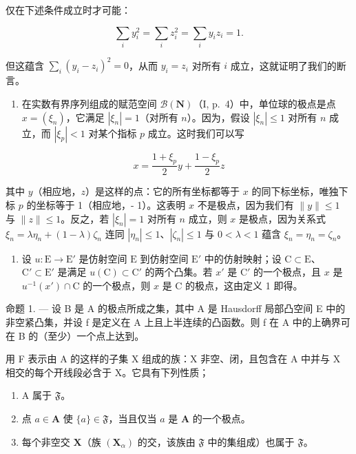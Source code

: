 仅在下述条件成立时才可能：

\[
\sum_ {i} y _ {i} ^ {2} = \sum_ {i} z _ {i} ^ {2} = \sum_ {i} y _ {i} z _ {i} = 1.
\]

但这蕴含 \(\sum_{i}(y_i - z_i)^2 = 0\)，从而 \(y_i = z_i\) 对所有 \(i\) 成立，这就证明了我们的断言。

\begin{enumerate}
\def\labelenumi{\arabic{enumi})}
\setcounter{enumi}{1}
\tightlist
\item
  在实数有界序列组成的赋范空间 \(\mathcal{B}(\mathbf{N})\)（I, p.~4）中，单位球的极点是点 \(x = (\xi_n)\)，它满足 \(|\xi_n| = 1\)（对所有 \(n\)）。因为，假设 \(|\xi_n| \leqslant 1\) 对所有 \(n\) 成立，而 \(|\xi_p| < 1\) 对某个指标 \(p\) 成立。这时我们可以写
\end{enumerate}

\[
x = \frac {1 + \xi_ {p}}{2} y + \frac {1 - \xi_ {p}}{2} z
\]

其中 \(y\)（相应地，\(z\)）是这样的点：它的所有坐标都等于 \(x\) 的同下标坐标，唯独下标 \(p\) 的坐标等于 1（相应地，- 1）。这表明 \(x\) 不是极点，因为我们有 \(\| y \| \leqslant 1\) 与 \(\| z \| \leqslant 1\)。反之，若 \(|\xi_n| = 1\) 对所有 \(n\) 成立，则 \(x\) 是极点，因为关系式 \(\xi_n = \lambda \eta_n + (1 - \lambda) \zeta_n\) 连同 \(|\eta_n| \leqslant 1\)、\(|\zeta_n| \leqslant 1\) 与 \(0 < \lambda < 1\) 蕴含 \(\xi_n = \eta_n = \zeta_n\)。

\begin{enumerate}
\def\labelenumi{\arabic{enumi})}
\setcounter{enumi}{2}
\tightlist
\item
  设 \(u: \mathrm{E} \to \mathrm{E}'\) 是仿射空间 \(\mathrm{E}\) 到仿射空间 \(\mathrm{E}'\) 中的仿射映射；设 \(\mathrm{C} \subset \mathrm{E}\)、\(\mathrm{C}' \subset \mathrm{E}'\) 是满足 \(u(\mathrm{C}) \subset \mathrm{C}'\) 的两个凸集。若 \(x'\) 是 \(\mathrm{C}'\) 的一个极点，且 \(x\) 是 \(u^{-1}(x') \cap \mathrm{C}\) 的一个极点，则 \(x\) 是 \(\mathrm{C}\) 的极点，这由定义 1 即得。
\end{enumerate}

命题 1. --- 设 B 是 A 的极点所成之集，其中 A 是 Hausdorff 局部凸空间 E 中的非空紧凸集，并设 f 是定义在 A 上且上半连续的凸函数。则 f 在 A 中的上确界可在 B 的（至少）一个点上达到。

用 F 表示由 A 的这样的子集 X 组成的族：X 非空、闭，且包含在 A 中并与 X 相交的每个开线段必含于 X。它具有下列性质；

\begin{enumerate}
\def\labelenumi{(\roman{enumi})}
\item
  A 属于 \(\mathfrak{F}\)。
\item
  点 \(a \in \mathbf{A}\) 使 \(\{a\} \in \mathfrak{F}\)，当且仅当 \(a\) 是 \(\mathbf{A}\) 的一个极点。
\item
  每个非空交 \(\mathbf{X}\)（族 \((\mathbf{X}_{\alpha})\) 的交，该族由 \(\mathfrak{F}\) 中的集组成）也属于 \(\mathfrak{F}\)。
\end{enumerate}

